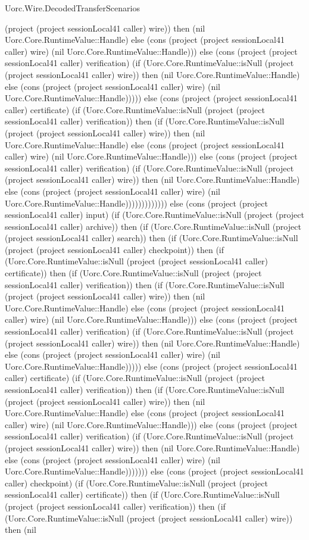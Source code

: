 \begin{lexlean}{Uorc.Wire.DecodedTransferScenarios}
\begin{semanticmodule}
{(project (project sessionLocal41 caller) wire)) then (nil Uorc.Core.RuntimeValue::Handle) else (cons (project (project sessionLocal41 caller) wire) (nil Uorc.Core.RuntimeValue::Handle))) else (cons (project (project sessionLocal41 caller) verification) (if (Uorc.Core.RuntimeValue::isNull (project (project sessionLocal41 caller) wire)) then (nil Uorc.Core.RuntimeValue::Handle) else (cons (project (project sessionLocal41 caller) wire) (nil Uorc.Core.RuntimeValue::Handle))))) else (cons (project (project sessionLocal41 caller) certificate) (if (Uorc.Core.RuntimeValue::isNull (project (project sessionLocal41 caller) verification)) then (if (Uorc.Core.RuntimeValue::isNull (project (project sessionLocal41 caller) wire)) then (nil Uorc.Core.RuntimeValue::Handle) else (cons (project (project sessionLocal41 caller) wire) (nil Uorc.Core.RuntimeValue::Handle))) else (cons (project (project sessionLocal41 caller) verification) (if (Uorc.Core.RuntimeValue::isNull (project (project sessionLocal41 caller) wire)) then (nil Uorc.Core.RuntimeValue::Handle) else (cons (project (project sessionLocal41 caller) wire) (nil Uorc.Core.RuntimeValue::Handle))))))))))))) else (cons (project (project sessionLocal41 caller) input) (if (Uorc.Core.RuntimeValue::isNull (project (project sessionLocal41 caller) archive)) then (if (Uorc.Core.RuntimeValue::isNull (project (project sessionLocal41 caller) search)) then (if (Uorc.Core.RuntimeValue::isNull (project (project sessionLocal41 caller) checkpoint)) then (if (Uorc.Core.RuntimeValue::isNull (project (project sessionLocal41 caller) certificate)) then (if (Uorc.Core.RuntimeValue::isNull (project (project sessionLocal41 caller) verification)) then (if (Uorc.Core.RuntimeValue::isNull (project (project sessionLocal41 caller) wire)) then (nil Uorc.Core.RuntimeValue::Handle) else (cons (project (project sessionLocal41 caller) wire) (nil Uorc.Core.RuntimeValue::Handle))) else (cons (project (project sessionLocal41 caller) verification) (if (Uorc.Core.RuntimeValue::isNull (project (project sessionLocal41 caller) wire)) then (nil Uorc.Core.RuntimeValue::Handle) else (cons (project (project sessionLocal41 caller) wire) (nil Uorc.Core.RuntimeValue::Handle))))) else (cons (project (project sessionLocal41 caller) certificate) (if (Uorc.Core.RuntimeValue::isNull (project (project sessionLocal41 caller) verification)) then (if (Uorc.Core.RuntimeValue::isNull (project (project sessionLocal41 caller) wire)) then (nil Uorc.Core.RuntimeValue::Handle) else (cons (project (project sessionLocal41 caller) wire) (nil Uorc.Core.RuntimeValue::Handle))) else (cons (project (project sessionLocal41 caller) verification) (if (Uorc.Core.RuntimeValue::isNull (project (project sessionLocal41 caller) wire)) then (nil Uorc.Core.RuntimeValue::Handle) else (cons (project (project sessionLocal41 caller) wire) (nil Uorc.Core.RuntimeValue::Handle))))))) else (cons (project (project sessionLocal41 caller) checkpoint) (if (Uorc.Core.RuntimeValue::isNull (project (project sessionLocal41 caller) certificate)) then (if (Uorc.Core.RuntimeValue::isNull (project (project sessionLocal41 caller) verification)) then (if (Uorc.Core.RuntimeValue::isNull (project (project sessionLocal41 caller) wire)) then (nil }
\end{semanticmodule}
\end{lexlean}
